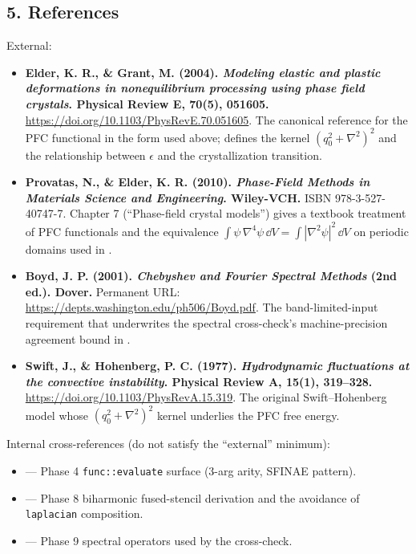 \subsection{5. References}\label{phase11-references}

External:

\begin{itemize}
\tightlist
\item
  \textbf{Elder, K. R., \& Grant, M. (2004). \emph{Modeling elastic
  and plastic deformations in nonequilibrium processing using phase
  field crystals}. Physical Review E, 70(5), 051605.}
  \url{https://doi.org/10.1103/PhysRevE.70.051605}. The canonical
  reference for the PFC functional in the form used above; defines the
  kernel
  \((q_0^2 + \nabla^2)^2\) and the relationship between
  \(\epsilon\) and the crystallization transition.
\item
  \textbf{Provatas, N., \& Elder, K. R. (2010). \emph{Phase-Field
  Methods in Materials Science and Engineering}. Wiley-VCH.} ISBN
  978-3-527-40747-7.
  Chapter 7 (``Phase-field crystal models'') gives a textbook
  treatment of PFC functionals and the equivalence
  \(\int \psi\,\nabla^4\psi\,\dd V = \int |\nabla^2\psi|^2\,\dd V\) on
  periodic domains used in .
\item
  \textbf{Boyd, J. P. (2001). \emph{Chebyshev and Fourier Spectral
  Methods} (2nd ed.). Dover.} Permanent URL:
  \url{https://depts.washington.edu/ph506/Boyd.pdf}. The
  band-limited-input requirement that underwrites the spectral
  cross-check's machine-precision agreement bound in
  .
\item
  \textbf{Swift, J., \& Hohenberg, P. C. (1977). \emph{Hydrodynamic
  fluctuations at the convective instability}. Physical Review A,
  15(1), 319--328.}
  \url{https://doi.org/10.1103/PhysRevA.15.319}. The original
  Swift--Hohenberg model whose
  \((q_0^2 + \nabla^2)^2\) kernel underlies the PFC free energy.
\end{itemize}

Internal cross-references (do not satisfy the ``external'' minimum):

\begin{itemize}
\tightlist
\item
   --- Phase 4
  \passthrough{\lstinline!func::evaluate!} surface (3-arg arity, SFINAE
  pattern).
\item
   --- Phase 8
  biharmonic fused-stencil derivation and the avoidance of
  \passthrough{\lstinline!laplacian!} composition.
\item
   --- Phase 9 spectral
  operators used by the cross-check.
\end{itemize}

